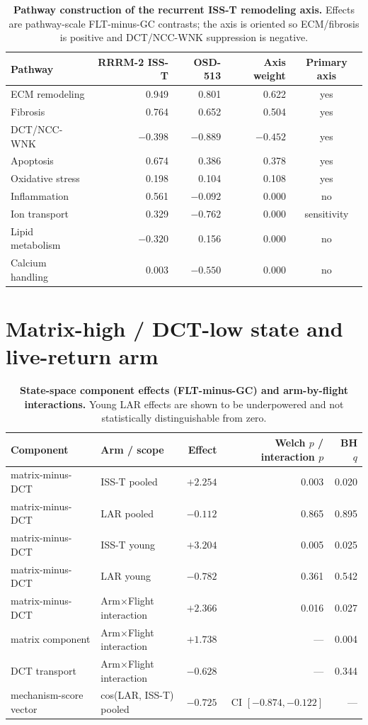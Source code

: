 \documentclass[10pt]{article}
\begin{document}
\begin{table}[H]
\centering\small
\caption{\textbf{Pathway construction of the recurrent ISS-T remodeling axis.} Effects are pathway-scale FLT-minus-GC contrasts; the axis is oriented so ECM/fibrosis is positive and DCT/NCC-WNK suppression is negative.}
\label{tab:axis}
\begin{tabular}{lrrrc}
\toprule
Pathway & RRRM-2 ISS-T & OSD-513 & Axis weight & Primary axis \\
\midrule
ECM remodeling & 0.949 & 0.801 & 0.622 & yes \\
Fibrosis & 0.764 & 0.652 & 0.504 & yes \\
DCT/NCC-WNK & $-0.398$ & $-0.889$ & $-0.452$ & yes \\
Apoptosis & 0.674 & 0.386 & 0.378 & yes \\
Oxidative stress & 0.198 & 0.104 & 0.108 & yes \\
Inflammation & 0.561 & $-0.092$ & 0.000 & no \\
Ion transport & 0.329 & $-0.762$ & 0.000 & sensitivity \\
Lipid metabolism & $-0.320$ & 0.156 & 0.000 & no \\
Calcium handling & 0.003 & $-0.550$ & 0.000 & no \\
\bottomrule
\end{tabular}
\end{table}

\section{Matrix-high / DCT-low state and live-return arm}

\begin{table}[H]
\centering\small
\caption{\textbf{State-space component effects (FLT-minus-GC) and arm-by-flight interactions.} Young LAR effects are shown to be underpowered and not statistically distinguishable from zero.}
\label{tab:state}
\begin{tabular}{llrrr}
\toprule
Component & Arm / scope & Effect & Welch $p$ / interaction $p$ & BH $q$ \\
\midrule
matrix-minus-DCT & ISS-T pooled & $+2.254$ & 0.003 & 0.020 \\
matrix-minus-DCT & LAR pooled & $-0.112$ & 0.865 & 0.895 \\
matrix-minus-DCT & ISS-T young & $+3.204$ & 0.005 & 0.025 \\
matrix-minus-DCT & LAR young & $-0.782$ & 0.361 & 0.542 \\
matrix-minus-DCT & Arm$\times$Flight interaction & $+2.366$ & 0.016 & 0.027 \\
matrix component & Arm$\times$Flight interaction & $+1.738$ & --- & 0.004 \\
DCT transport & Arm$\times$Flight interaction & $-0.628$ & --- & 0.344 \\
mechanism-score vector & cos(LAR, ISS-T) pooled & $-0.725$ & CI $[-0.874,-0.122]$ & --- \\
\bottomrule
\end{tabular}
\end{table}
\end{document}
